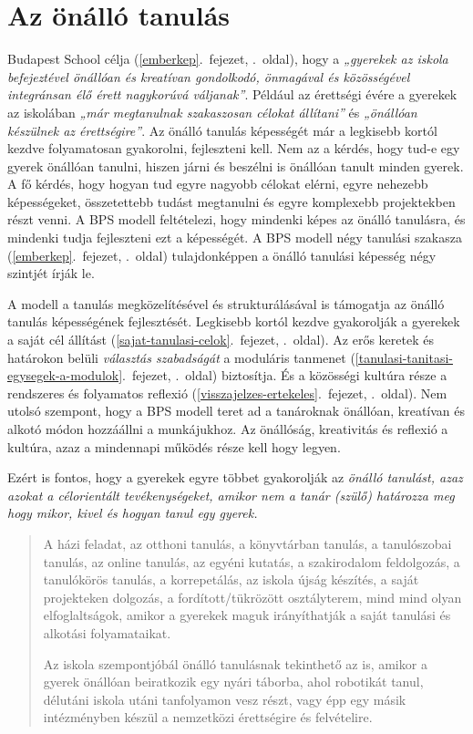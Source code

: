 \hypertarget{az-onallo-tanulas}{%
\section{Az önálló tanulás}\label{az-onallo-tanulas}}

Budapest School
célja (\ref{emberkep}.~fejezet, \pageref{emberkep}.~oldal), hogy a
\emph{„gyerekek az iskola befejeztével önállóan és kreatívan gondolkodó,
önmagával és közösségével integránsan élő érett nagykorúvá
váljanak''}. Például az érettségi évére a gyerekek az iskolában
\emph{„már megtanulnak szakaszosan célokat állítani''} és \emph{„önállóan
készülnek az érettségire''}. Az önálló tanulás képességét már a legkisebb
kortól kezdve folyamatosan gyakorolni, fejleszteni kell. Nem az a
kérdés, hogy tud-e egy gyerek önállóan tanulni, hiszen járni és beszélni
is önállóan tanult minden gyerek. A fő kérdés, hogy hogyan tud egyre
nagyobb célokat elérni, egyre nehezebb képességeket, összetettebb tudást
megtanulni és egyre komplexebb projektekben részt venni. A BPS modell
feltételezi, hogy mindenki képes az önálló tanulásra, és mindenki tudja
fejleszteni ezt a képességét. A BPS modell
négy tanulási szakasza (\ref{emberkep}.~fejezet, \pageref{emberkep}.~oldal)
tulajdonképpen a önálló tanulási képesség négy szintjét írják le.

A modell a tanulás megközelítésével és strukturálásával is támogatja az
önálló tanulás képességének fejlesztését. Legkisebb kortól kezdve
gyakorolják a gyerekek a
saját cél állítást (\ref{sajat-tanulasi-celok}.~fejezet, \pageref{sajat-tanulasi-celok}.~oldal).
Az erős keretek és határokon belüli \emph{választás szabadságát} a
moduláris tanmenet (\ref{tanulasi-tanitasi-egysegek-a-modulok}.~fejezet, \pageref{tanulasi-tanitasi-egysegek-a-modulok}.~oldal)
biztosítja. És a közösségi kultúra része a rendszeres és
folyamatos reflexió (\ref{visszajelzes-ertekeles}.~fejezet, \pageref{visszajelzes-ertekeles}.~oldal).
Nem utolsó szempont, hogy a BPS modell teret ad a tanároknak önállóan,
kreatívan és alkotó módon hozzáállni a munkájukhoz. Az önállóság,
kreativitás és reflexió a kultúra, azaz a mindennapi működés része kell
hogy legyen.

Ezért is fontos, hogy a gyerekek egyre többet gyakorolják az
\emph{önálló tanulást, azaz azokat a célorientált tevékenységeket,
amikor nem a tanár (szülő) határozza meg hogy mikor, kivel és hogyan
tanul egy gyerek.}

\begin{quote}
A házi feladat, az otthoni tanulás, a könyvtárban tanulás, a
tanulószobai tanulás, az online tanulás, az egyéni kutatás, a
szakirodalom feldolgozás, a tanulókörös tanulás, a korrepetálás, az
iskola újság készítés, a saját projekteken dolgozás, a
fordított/tükrözött osztályterem, mind mind olyan elfoglaltságok, amikor
a gyerekek maguk irányíthatják a saját tanulási és alkotási
folyamataikat.

Az iskola szempontjóbál önálló tanulásnak tekinthető az is, amikor a
gyerek önállóan beiratkozik egy nyári táborba, ahol robotikát tanul,
délutáni iskola utáni tanfolyamon vesz részt, vagy épp egy másik
intézményben készül a nemzetközi érettségire és felvételire.
\end{quote}

